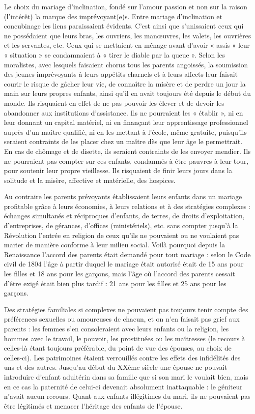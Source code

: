  Le choix du mariage d'inclination, fondé sur l'amour passion et non sur la raison (l'intérêt) la marque des imprévoyant(e)s. Entre mariage d'inclination et concubinage les liens paraissaient évidents. C'est ainsi que s'unissaient ceux qui ne possédaient que leurs bras, les ouvriers, les manœuvres, les valets, les ouvrières et les servantes, etc. Ceux qui se mettaient en ménage avant d'avoir « assis » leur « situation » se condamnaient à « tirer le diable par la queue ». Selon les moralistes, avec lesquels faisaient chorus tous les parents angoissés, la soumission des jeunes imprévoyants à leurs appétits charnels et à leurs affects leur faisait courir le risque de gâcher leur vie, de connaître la misère et de perdre un jour la main sur leurs propres enfants, ainsi qu'il en avait toujours été depuis le début du monde. Ils risquaient en effet de ne pas pouvoir les élever et de devoir les abandonner aux institutions d'assistance. Ils ne pourraient les « établir », ni en leur donnant un capital matériel, ni en finançant leur apprentissage professionnel auprès d'un maître qualifié, ni en les mettant à l'école, même gratuite, puisqu'ils seraient contraints de les placer chez un maître dès que leur âge le permettrait. En cas de chômage et de disette, ils seraient contraints de les envoyer mendier. Ils ne pourraient pas compter sur ces enfants, condamnés à être pauvres à leur tour, pour soutenir leur propre vieillesse. Ils risquaient de finir leurs jours dans la solitude et la misère, affective et matérielle, des hospices.

 Au contraire les parents prévoyants établissaient leurs enfants dans un mariage profitable grâce à leurs économies, à leurs relations et à des stratégies complexes : échanges simultanés et réciproques d'enfants, de terres, de droits d'exploitation, d'entreprises, de gérances, d'offices (ministériels), etc. sans compter jusqu'à la Révolution l'entrée en religion de ceux qu'ils ne pouvaient ou ne voulaient pas marier de manière conforme à leur milieu social. Voilà pourquoi depuis la Renaissance l'accord des parents était demandé pour tout mariage : selon le Code civil de 1804 l'âge à partir duquel le mariage était autorisé était de 15 ans pour les filles et 18 ans pour les garçons, mais l'âge où l'accord des parents cessait d'être exigé était bien plus tardif : 21 ans pour les filles et 25 ans pour les garçons.
 
 Des stratégies familiales si complexes ne pouvaient pas toujours tenir compte des préférences sexuelles ou amoureuses de chacun, et on n'en faisait pas grief aux parents : les femmes s'en consoleraient avec leurs enfants ou la religion, les hommes avec le travail, le pouvoir, les prostituées ou les maîtresses (le recours à celles-là étant toujours préférable, du point de vue des épouses, au choix de celles-ci). Les patrimoines étaient verrouillés contre les effets des infidélités des uns et des autres. Jusqu'au début du XXème siècle une épouse ne pouvait introduire d'enfant adultérin dans sa famille que si son mari le voulait bien, mais en ce cas la paternité de celui-ci devenait absolument inattaquable : le géniteur n'avait aucun recours. Quant aux enfants illégitimes du mari, ils ne pouvaient pas être légitimés et menacer l'héritage des enfants de l'épouse. 


